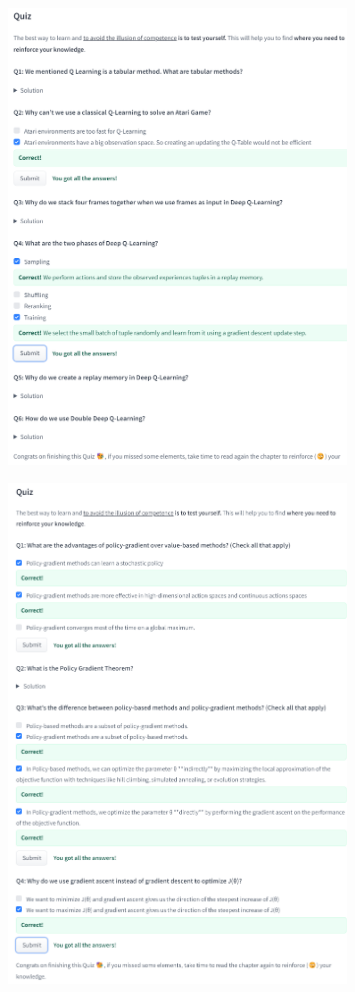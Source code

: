 \begin{homeworkProblem}
\begin{figure}[H]
    \includegraphics[width=0.8\textwidth]{../Img/Huggingface_DRL/unit3_quiz.png}
\end{figure}
\begin{figure}[H]
    \centering
    \includegraphics[width=0.8\textwidth]{../Img/Huggingface_DRL/unit4_quiz.png}

\end{figure}
\end{homeworkProblem}
